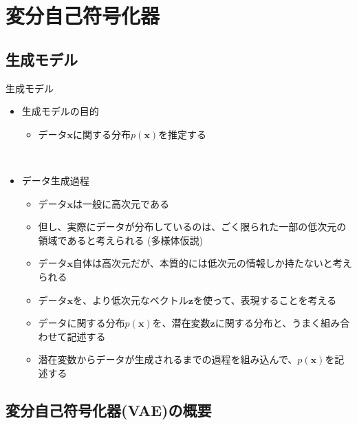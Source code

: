 \documentclass[dvipdfmx,notheorems,t]{beamer}
\begin{document}
\section{変分自己符号化器}

\subsection{生成モデル}

\begin{frame}{生成モデル}

\begin{itemize}
	\item 生成モデルの目的
	\begin{itemize}
		\item データ$\bm{x}$に関する分布$p(\bm{x})$を推定する
	\end{itemize} \
	
	\item データ生成過程
	\begin{itemize}
		\item データ$\bm{x}$は一般に高次元である
		\item 但し、実際にデータが分布しているのは、ごく限られた一部の低次元の領域であると考えられる (\alert{多様体仮説})
		\item データ$\bm{x}$自体は高次元だが、本質的には低次元の情報しか持たないと考えられる
		\newline
		
		\item データ$\bm{x}$を、より低次元なベクトル$\bm{z}$を使って、表現することを考える
		\item データに関する分布$p(\bm{x})$を、潜在変数$\bm{z}$に関する分布と、うまく組み合わせて記述する
		\item \alert{潜在変数からデータが生成されるまでの過程}を組み込んで、$p(\bm{x})$を記述する
	\end{itemize}
\end{itemize}

\end{frame}

\subsection{変分自己符号化器(VAE)の概要}
\end{document}
